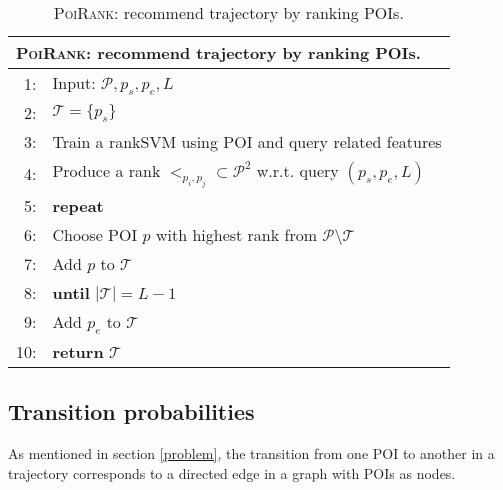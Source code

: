 \begin{table}
\centering
\small
\begin{tabular}{rl}
\hline
\multicolumn{2}{l}{\textsc{PoiRank}: recommend trajectory by ranking POIs.} \\
\hline
 1:& Input: $\mathcal{P}, p_s, p_e, L$ \\
 2:& $\mathcal{T} = \{p_s\}$ \\
 3:& Train a rankSVM using POI and query related features \\
 4:& Produce a rank $<_{p_i, p_j} \subset \mathcal{P}^2$ w.r.t. query $(p_s, p_e, L)$\\
 5:& \textbf{repeat} \\
 6:&\hspace{10pt} Choose POI $p$ with highest rank from $\mathcal{P} \setminus \mathcal{T}$ \\
 7:&\hspace{10pt} Add $p$ to $\mathcal{T}$ \\
 8:&\textbf{until} $|\mathcal{T}| = L-1$ \\
 9:& Add $p_e$ to $\mathcal{T}$ \\
10:& \textbf{return} $\mathcal{T}$ \\
\hline
\end{tabular}
\caption{\textsc{PoiRank}: recommend trajectory by ranking POIs.}
\label{alg:poirank}
\end{table}


\subsection{Transition probabilities}
\label{transition}
%
As mentioned in section \ref{problem}, the transition from one POI to another in a trajectory
corresponds to a directed edge in a graph with POIs as nodes.

